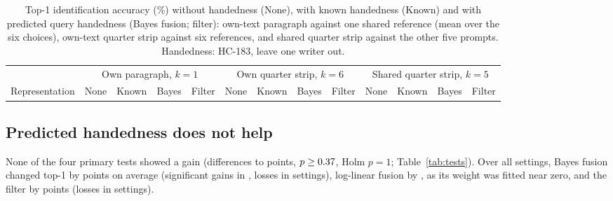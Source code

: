 \documentclass[conference,a4paper]{IEEEtran}
\begin{document}
\begin{table}[t]
\caption{Top-1 identification accuracy (\%) without handedness (None), with known handedness (Known) and with predicted query handedness (Bayes fusion; filter): own-text paragraph against one shared reference (mean over the six choices), own-text quarter strip against six references, and shared quarter strip against the other five prompts. Handedness: HC-183, leave one writer out.}
\label{tab:main}
\centering\footnotesize
\begin{tabular}{lcccccccccccc}
\toprule
 & \multicolumn{4}{c}{Own paragraph, $k=1$} & \multicolumn{4}{c}{Own quarter strip, $k=6$} & \multicolumn{4}{c}{Shared quarter strip, $k=5$} \\
\cmidrule(lr){2-5}\cmidrule(lr){6-9}\cmidrule(lr){10-13}
Representation & None & Known & Bayes & Filter & None & Known & Bayes & Filter & None & Known & Bayes & Filter \\
\midrule
\end{tabular}
\end{table}

\subsection{Predicted handedness does not help}
\label{sec:pred}
None of the four primary tests showed a gain (differences \vPrimDiffMin{} to \vPrimDiffMax{} points, $p\geq0.37$, Holm $p=1$; Table~\ref{tab:tests}). Over all settings, Bayes fusion changed top-1 by \vBayesGain{} points on average (significant gains in \vBayesSigUp{}, losses in \vBayesSigDown{} settings), log-linear fusion by \vLoglinGain{}, as its weight was fitted near zero, and the filter by \vFilterGain{} points (losses in \vFilterSigDown{} settings).

\begin{table}[t]
\caption{Primary tests: Bayes fusion of predicted query handedness against no fusion (top-1, \%). Diff.: writer-level mean difference (points) with writer-bootstrap interval; $p$: 9,999 sign flips; Holm over the four tests.}
\label{tab:tests}
\centering\scriptsize
\setlength{\tabcolsep}{1.8pt}
\end{table}
\end{document}
